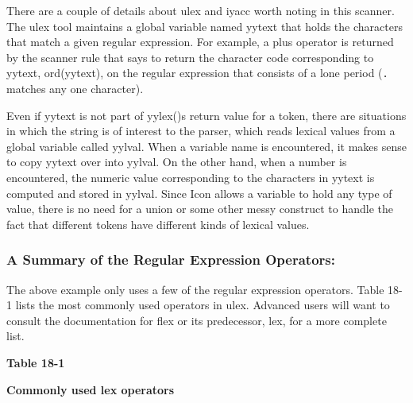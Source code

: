 There are a couple of details about \textsf{ulex} and \textsf{iyacc}
worth noting in this scanner. The \textsf{ulex} tool maintains a global
variable named \textsf{yytext} that holds the characters that match a
given regular expression. For example, a plus operator is returned by
the scanner rule that says to return the character code corresponding
to \textsf{yytext}, \textsf{ord(yytext)}, on the regular expression
that consists of a lone period (\texttt{.} matches any one character).

Even if \textsf{yytext} is not part of
\textsf{yylex()}{\textquotesingle}s return value for a token, there are
situations in which the string is of interest to the parser, which
reads lexical values from a global variable called \textsf{yylval}.
When a variable name is encountered, it makes sense to copy
\textsf{yytext} over into \textsf{yylval}. On the other hand, when a
number is encountered, the numeric value corresponding to the
characters in \textsf{yytext} is computed and stored in
\textsf{yylval}. Since Icon allows a variable to hold any type of
value, there is no need for a union or some other messy construct to
handle the fact that different tokens have different kinds of lexical
values.

\subsubsection{A Summary of the Regular Expression Operators:}

The above example only uses a few of the regular expression operators.
Table 18-1 lists the most commonly used operators in \textsf{ulex}.
Advanced users will want to consult the documentation for \textsf{flex}
or its predecessor, \textsf{lex}, for a more complete list.

{\centering\sffamily\bfseries
Table 18-1
\par}

{\centering\sffamily\bfseries
Commonly used lex operators
\par}

